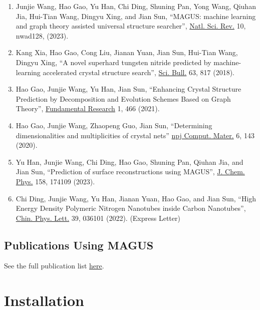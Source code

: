 \documentclass[12pt,oneside]{book}
\begin{document}
\begin{enumerate}
    \item Junjie Wang, Hao Gao, Yu Han, Chi Ding, Shuning Pan, Yong Wang, Qiuhan Jia, Hui-Tian Wang, Dingyu Xing, and Jian Sun, ``MAGUS: machine learning and graph theory assisted universal structure searcher'', \href{https://doi.org/10.1093/nsr/nwad128}{Natl. Sci. Rev.} 10, nwad128, (2023).
    
    \item Kang Xia, Hao Gao, Cong Liu, Jianan Yuan, Jian Sun, Hui-Tian Wang, Dingyu Xing, ``A novel superhard tungsten nitride predicted by machine-learning accelerated crystal structure search'', \href{https://doi.org/10.1016/j.scib.2018.05.027}{Sci. Bull.} 63, 817 (2018).
    
    \item Hao Gao, Junjie Wang, Yu Han, Jian Sun, ``Enhancing Crystal Structure Prediction by Decomposition and Evolution Schemes Based on Graph Theory'', \href{https://doi.org/10.1016/j.fmre.2021.06.005}{Fundamental Research} 1, 466 (2021).
    
    \item Hao Gao, Junjie Wang, Zhaopeng Guo, Jian Sun, ``Determining dimensionalities and multiplicities of crystal nets'' \href{https://doi.org/10.1038/s41524-020-00409-0}{npj Comput. Mater.} 6, 143 (2020).
    
    \item Yu Han, Junjie Wang, Chi Ding, Hao Gao, Shuning Pan, Qiuhan Jia, and Jian Sun, ``Prediction of surface reconstructions using MAGUS'', \href{https://doi.org/10.1063/5.0142281}{J. Chem. Phys.} 158, 174109 (2023).
    
    \item Chi Ding, Junjie Wang, Yu Han, Jianan Yuan, Hao Gao, and Jian Sun, ``High Energy Density Polymeric Nitrogen Nanotubes inside Carbon Nanotubes'', \href{https://doi.org/10.1088/0256-307X/39/3/036101}{Chin. Phys. Lett.} 39, 036101 (2022). (Express Letter)
\end{enumerate}

\section{Publications Using MAGUS}
  See the full publication list \href{https://gitlab.com/bigd4/magus/-/wikis/home/Publications}{here}.




\chapter{Installation}
\end{document}

